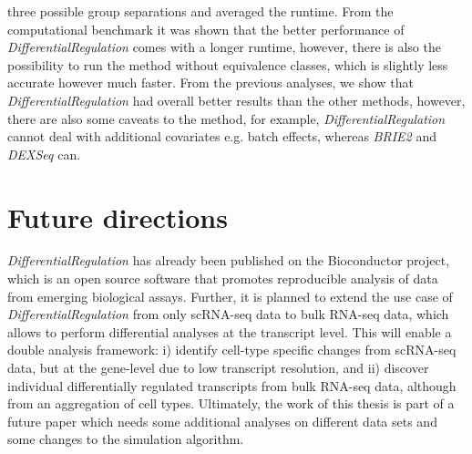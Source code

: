 three possible group separations and averaged the runtime. From the computational benchmark it was shown that the better performance of \emph{DifferentialRegulation} comes with a longer runtime, however, there is also the possibility to run the method without equivalence classes, which is slightly less accurate however much faster. From the previous analyses, we show that \emph{DifferentialRegulation} had overall better results than the other methods, however, there are also some caveats to the method, for example, \emph{DifferentialRegulation} cannot deal with additional covariates e.g. batch effects, whereas \emph{BRIE2} and \emph{DEXSeq} can.

\section{Future directions}
\emph{DifferentialRegulation} has already been published on the Bioconductor project, which is an open source software that promotes reproducible analysis of data from emerging biological assays. Further, it is planned to extend the use case of \emph{DifferentialRegulation} from only scRNA-seq data to bulk RNA-seq data, which allows to perform differential analyses at the transcript level. This will enable a double analysis framework: i) identify cell-type specific changes from scRNA-seq data, but at the gene-level due to low transcript resolution, and ii) discover individual differentially regulated transcripts from bulk RNA-seq data, although from an aggregation of cell types. Ultimately, the work of this thesis is part of a future paper which needs some additional analyses on different data sets and some changes to the simulation algorithm.
